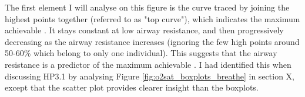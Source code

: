 The first element I will analyse on this figure is the curve traced by joining the highest points together (referred to as "top curve"), which indicates the maximum achievable  \OXSatPrct. It stays constant at low airway resistance, and then progressively decreasing as the airway resistance increases (ignoring the few high points around 50-60\% which belong to only one individual). This suggests that the airway resistance is a predictor of the maximum achievable \OXSatPrct. I had identified this when discussing HP3.1 by analysing Figure \ref{fig:o2sat_boxplots_breathe} in section X, except that the scatter plot provides clearer insight than the boxplots. 








